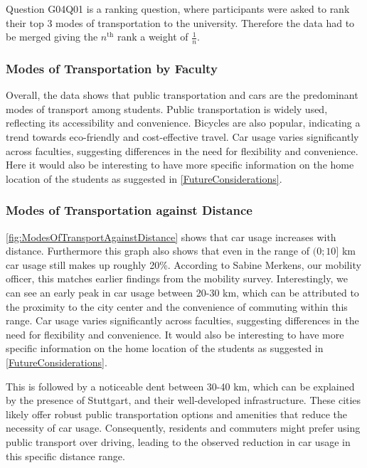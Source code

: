 Question G04Q01 is a ranking question, where participants were asked to rank their top 3 modes of transportation to the university. 
Therefore the data had to be merged giving the $n^\text{th}$ rank a weight of $\frac{1}{n}$.

\subsubsection{Modes of Transportation by Faculty}

\begin{multicols}{2}
    
    \columnbreak
    Overall, the data shows that public transportation and cars are the predominant modes of transport among students. Public transportation is widely used, reflecting its accessibility and convenience. Bicycles are also popular, indicating a trend towards eco-friendly and cost-effective travel. Car usage varies significantly across faculties, suggesting differences in the need for flexibility and convenience. Here it would also be interesting to have more specific information on the home location of the students as suggested in \ref{FutureConsiderations}.
\end{multicols}

\subsubsection{Modes of Transportation against Distance}

\begin{multicols}{2}
    
    \columnbreak
    \ref{fig:ModesOfTransportAgainstDistance} shows that car usage increases with distance. Furthermore this graph also shows that even in the range of $(0;10]$ km car usage still makes up roughly 20\%. According to Sabine Merkens, our mobility officer, this matches earlier findings from the mobility survey. 
    Interestingly, we can see an early peak in car usage between 20-30 km, which can be attributed to the proximity to the city center and the convenience of commuting within this range.
    Car usage varies significantly across faculties, suggesting differences in the need for flexibility and convenience. It would also be interesting to have more specific information on the home location of the students as suggested in \ref{FutureConsiderations}.
\end{multicols}


This is followed by a noticeable dent between 30-40 km, which can be explained by the presence of Stuttgart, and their well-developed infrastructure. These cities likely offer robust public transportation options and amenities that reduce the necessity of car usage. Consequently, residents and commuters might prefer using public transport over driving, leading to the observed reduction in car usage in this specific distance range.

